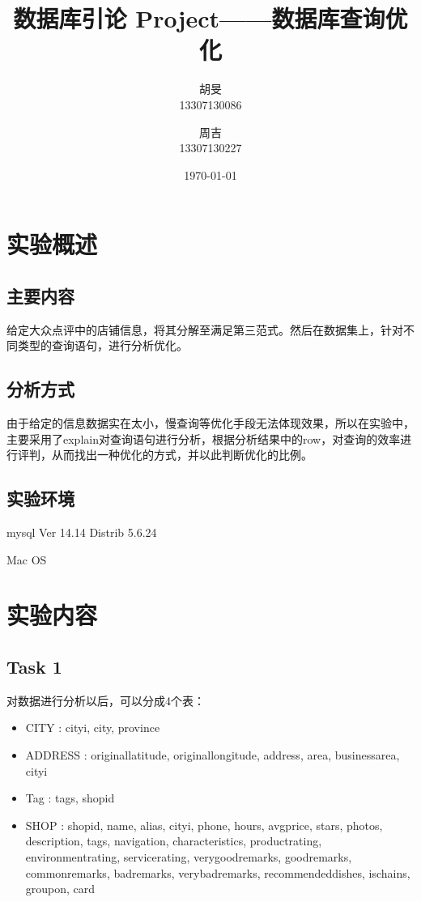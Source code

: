 \documentclass[a4paper, 11pt, nofonts, nocap, fancyhdr]{ctexart}
\title{数据库引论 Project——数据库查询优化}
\author
{
	胡旻\\
	13307130086
	\and
	周吉\\
	13307130227
}
\date{\today}
\begin{document}
\maketitle
\tableofcontents
\setcounter{page}{0}
\thispagestyle{empty}
\newpage

\section{实验概述}

\subsection{主要内容}

给定大众点评中的店铺信息，将其分解至满足第三范式。然后在数据集上，针对不同类型的查询语句，进行分析优化。

\subsection{分析方式}

由于给定的信息数据实在太小，慢查询等优化手段无法体现效果，所以在实验中，主要采用了explain对查询语句进行分析，根据分析结果中的row，对查询的效率进行评判，从而找出一种优化的方式，并以此判断优化的比例。

\subsection{实验环境}

mysql  Ver 14.14 Distrib 5.6.24

Mac OS

\section{实验内容}

\subsection{Task 1}

对数据进行分析以后，可以分成4个表：

\begin{itemize}
    \item CITY : cityi, city, province
    \item ADDRESS : originallatitude, originallongitude, address, area, businessarea, cityi
    \item Tag : tags, shopid
    \item SHOP : shopid, name, alias, cityi, phone, hours, avgprice, stars, photos, description, tags, navigation, characteristics, productrating, environmentrating, servicerating, verygoodremarks, goodremarks, commonremarks, badremarks, verybadremarks, recommendeddishes, ischains, groupon, card
\end{itemize}
\end{document}
